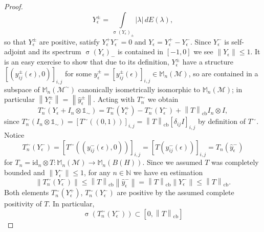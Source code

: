 \documentclass[reqno]{amsart}
\theoremstyle{plain}
\numberwithin{equation}{section}
\numberwithin{theorem}{section}
\numberwithin{lemma}{section}
\numberwithin{definition}{section}
\numberwithin{corollary}{section}
\numberwithin{remark}{section}
\newcommand{\naturals}{\mathbb{N}}
\newcommand{\spec}[1]{\operatorname{\sigma}{\left(#1\right)}}
\newcommand{\id}[1]{\mathrm{id}_{#1}}
\newcommand{\cbnorm}[1]{\left\| #1 \right\|_{\mathrm{cb}}}
\newcommand{\matra}[2]{\mathbb{M}_{#1}(#2)}
\newcommand{\unit}{\mathds{1}}
\begin{document}
\begin{proof}
    \begin{equation}
        Y_{\epsilon}^{\pm} = \int\limits_{\spec{Y_\epsilon}_\pm} |\lambda| \, dE(\lambda),
    \end{equation}
    so that $Y_{\epsilon}^{\pm}$ are positive, satisfy $Y_{\epsilon}^{+} Y_{\epsilon}^{-} = 0$ and $Y_\epsilon = Y_{\epsilon}^{+} - Y_{\epsilon}^{-}$. Since $Y_{\epsilon}^{-}$ is self-adjoint and its spectrum $\spec{Y_\epsilon}_-$ is contained in $[-1,0]$ we see $\| Y_\epsilon \| \leqslant 1$. It is an easy exercise to show that due to its definition, $Y_{\epsilon}^{\pm}$ have a structure $\left[(y_{ij}^{\pm}(\epsilon),0)\right]_{i,j}$ for some $\hat{y}_{\epsilon}^{\pm} = \left[y_{ij}^{\pm}(\epsilon)\right]_{i,j}\in \matra{n}{\mathscr{M}}$, so are contained in a subspace of $\matra{n}{\mathscr{M}^\sim}$ canonically isometrically isomorphic to $\matra{n}{\mathscr{M}}$; in particular $\left\|Y_{\epsilon}^{\pm}\right\| = \left\| \hat{y}_{\epsilon}^{\pm} \right\|$. Acting with $T_{n}^{\sim}$ we obtain
    \begin{equation}\label{eq:TnSimOnYplusUnit}
        T_{n}^{\sim}(Y_\epsilon + I_n \otimes \unit_\sim) = T_{n}^{\sim}(Y_{\epsilon}^{+}) - T_{n}^{\sim}(Y_{\epsilon}^{-}) + \cbnorm{T} I_n \otimes I,
    \end{equation}
    since $T_{n}^{\sim}(I_n \otimes \unit_\sim) = \left[ T^\sim ((0,1)) \right]_{i,j} = \cbnorm{T}\left[\delta_{ij}I\right]_{i,j}$ by definition of $T^\sim$. Notice
    \begin{equation}
        T_{n}^{\sim}(Y_{\epsilon}^{-}) = \left[ T^\sim ((y_{ij}^{-}(\epsilon),0)) \right]_{i,j} = \left[T(y_{ij}^{-}(\epsilon))\right]_{i,j} = T_n (\hat{y}^{-}_\epsilon)
    \end{equation}
    for $T_n = \id{n} \otimes T : \matra{n}{\mathscr{M}}\to \matra{n}{B(H)}$. Since we assumed $T$ was completely bounded and $\left\| Y_{\epsilon}^{-}\right\| \leqslant 1$, for any $n\in\naturals$ we have en estimation
    \begin{equation}
        \left\|T_{n}^{\sim}(Y_{\epsilon}^{-}) \right\| \leqslant \cbnorm{T} \left\|\hat{y}^{-}_{\epsilon}\right\| = \cbnorm{T} \left\| Y_{\epsilon}^{-} \right\| \leqslant \cbnorm{T}.
    \end{equation}
    Both elements $T_{n}^{\sim}(Y_{\epsilon}^{+})$, $T_{n}^{\sim}(Y_{\epsilon}^{-})$ are positive by the assumed complete positivity of $T$. In particular,
    \begin{equation}
        \spec{T_{n}^{\sim}(Y_{\epsilon}^{-})} \subset [0, \cbnorm{T}]
    \end{equation}

\end{proof}
\end{document}
